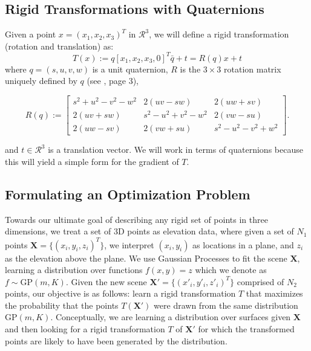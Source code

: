 \documentclass{article} %
\begin{document}
\subsection{Rigid Transformations with Quaternions}
Given a point $x = (x_1,x_2,x_3)^T$ in $\mathcal{R}^3$, we will define a rigid transformation (rotation and translation) as:
$$T(x) := q [x_1, x_2, x_3, 0]^T \bar q +t = R(q) x + t$$ where $q = (s,u,v,w)$ is a unit quaternion, $R$ is the $3 \times 3$ rotation matrix uniquely defined by $q$ (see \cite{wheeler1995}, page 3),

\begin{equation}
R(q) := \left[ \begin{array}{ccc}
s^2+u^2-v^2-w^2 & 2(uv-sw) & 2(uw+sv)\\
2(uv+sw) & s^2-u^2+v^2-w^2 & 2(vw-su)\\
2(uw-sv) & 2(vw+su) & s^2-u^2-v^2+w^2\end{array} \right].
\end{equation} 

and $t \in \mathcal{R}^3$ is a translation vector. We will work in terms of quaternions because this will yield a simple form for the gradient of $T$. 


%
%

\subsection{Formulating an Optimization Problem}
Towards our ultimate goal of describing any rigid set of points in three dimensions, we treat a set of 3D points as elevation data, where given a set of $N_1$ points $\mathbf{X} = \{(x_i,y_i,z_i)^{T}\}$, we interpret $(x_i,y_i)$ as locations in a plane, and $z_i$ as the elevation above the plane. We use Gaussian Processes to fit the scene $\mathbf{X}$, learning a distribution over functions $f(x,y) = z$ which we denote as $f \sim \mbox{GP}(m,K)$. Given the new scene $\mathbf{X'} = \{(x'_i,y'_i,z'_i)^{T}\}$ comprised of $N_2$ points, our objective is as follows: learn a rigid transformation $T$ that maximizes the probability that the points $T(\mathbf{X'})$ were drawn from the same distribution $\mbox{GP}(m,K)$. Conceptually, we are learning a distribution over surfaces given $\mathbf{X}$ and then looking for a rigid transformation $T$ of $\mathbf{X'}$ for which the transformed points are likely to have been generated by the distribution.
\end{document}
